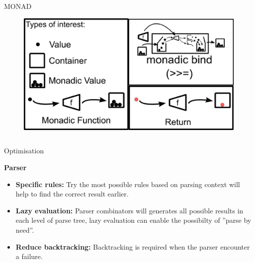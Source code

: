 \documentclass[final]{beamer}
\newlength{\onecolwid}
\newlength{\twocolwid}
\begin{document}
\begin{frame}[t]
\begin{columns}[t]
\begin{column}{\twocolwid}
\begin{alertblock}{MONAD}

\begin{figure}
\includegraphics[width=0.8\linewidth]{img/monad.jpg}

\end{figure}
\end{alertblock}


\begin{columns}[t,totalwidth=\twocolwid] %

\begin{column}{\onecolwid} %


\begin{block}{Optimisation}

\textbf{Parser}
\begin{itemize}
\item \textbf{Specific rules:} Try the most possible rules based on parsing context will help to find the correct result earlier.
\item \textbf{Lazy evaluation:} Parser combinators will generates all possible results in each level
of parse tree, lazy evaluation can enable the possibilty of ''parse by need''.
\item \textbf{Reduce backtracking:} Backtracking is required when the parser encounter a failure.


\end{itemize}
\end{block}
\end{column}
\end{columns}
\end{column}
\end{columns}
\end{frame}
\end{document}
